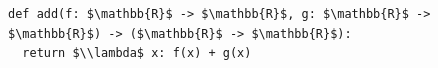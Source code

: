 \documentclass[border=10pt]{standalone}
\begin{document}
\begin{lstlisting}
def add(f: $\mathbb{R}$ -> $\mathbb{R}$, g: $\mathbb{R}$ -> $\mathbb{R}$) -> ($\mathbb{R}$ -> $\mathbb{R}$):
  return $\\lambda$ x: f(x) + g(x)
\end{lstlisting}
\end{document}
